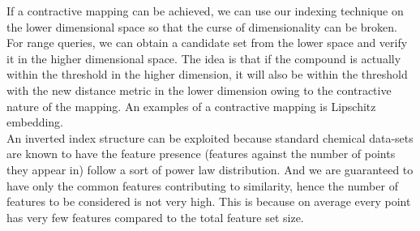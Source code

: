If a contractive mapping can be achieved, we can use our indexing technique on the lower dimensional space so that the curse of dimensionality can be broken. For range queries, we can obtain a candidate set from the lower space and verify it in the higher dimensional space. The idea is that if the compound is actually within the threshold in the higher dimension, it will also be within the threshold with the new distance metric in the lower dimension owing to the contractive nature of the mapping. An examples of a contractive mapping is Lipschitz embedding.\\

An inverted index structure can be exploited because standard chemical data-sets are known to have the feature presence (features against the number of points they appear in) follow a sort of power law distribution. And we are guaranteed to have only the common features contributing to similarity, hence the number of features to be considered is not very high. This is because on average every point has very few features compared to the total feature set size.\\
